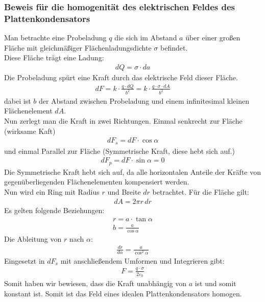 \documentclass{article}
\begin{document}
\subsubsection{Beweis für die homogenität des elektrischen Feldes des Plattenkondensators}
Man betrachte eine Probeladung $q$ die sich im Abstand $a$ über einer großen Fläche mit 
gleichmäßiger Flächenladungsdichte $\sigma$ befindet.\\
Diese Fläche trägt eine Ladung:
\begin{align}
    dQ=\sigma\cdot da
\end{align}
Die Probeladung spürt eine Kraft durch das elektrische Feld dieser Fläche.
\begin{align}
    dF=k\cdot\frac{q\cdot dQ}{b^2}=k\cdot \frac{q\cdot \sigma\cdot dA}{b^2}
\end{align}
dabei ist $b$ der Abstand zwischen Probeladung und einem infinitesimal kleinen Flächenelement $dA$.\\

\noindent Nun zerlegt man die Kraft in zwei Richtungen. 
Einmal senkrecht zur Fläche (wirksame Kaft)
\begin{align}
    dF_s=dF\cdot \cos \alpha
\end{align}
und einmal Parallel zur Fläche (Symmetrische Kraft, diese hebt sich auf.)
\begin{align}
    dF_p=dF\cdot \sin \alpha=0
\end{align}
Die Symmetrische Kraft hebt sich auf, da alle horizontalen Anteile der Kräfte von gegenüberliegenden
Flächenelementen kompensiert werden.\\

\noindent Nun wird ein Ring mit Radius $r$ und Breite $dr$ betrachtet. Für die Fläche gilt:
\begin{align}
    dA=2\pi r\,dr
\end{align}
Es gelten folgende Beziehungen:
\begin{align}
    r=a\cdot\tan\alpha\\
    b=\frac{a}{\cos\alpha}
\end{align}
Die Ableitung von $r$ nach $\alpha$:
\begin{align}
    \frac{dr}{d\alpha}=\frac{a}{\cos^2\alpha}
\end{align}
Eingesetzt in $dF_s$ mit anschließendem Umformen und Integrieren gibt:
\begin{align}
    F=\frac{q\cdot \sigma}{2\varepsilon_0}
\end{align}
Somit haben wir bewiesen, dass die Kraft unabhängig von $a$ ist und somit konstant ist.
Somit ist das Feld eines idealen Plattenkondensators homogen.\\
\end{document}
